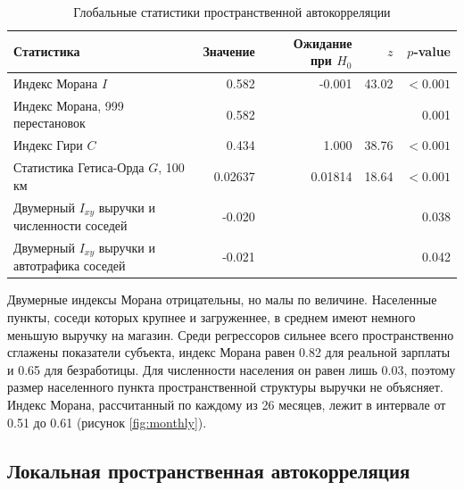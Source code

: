 \documentclass[12pt, a4paper]{article}
\begin{document}
\begin{table}[H]
    \centering
    \footnotesize
    \caption{Глобальные статистики пространственной автокорреляции}
    \label{tab:global}
    \begin{tabular}{lrrrr}
        \toprule
        \textbf{Статистика} & \textbf{Значение} & \textbf{Ожидание при $H_0$} & \textbf{$z$} & \textbf{$p$-value} \\
        \midrule
        Индекс Морана $I$ & 0.582 & -0.001 & 43.02 & $< 0.001$ \\
        Индекс Морана, 999 перестановок & 0.582 &  &  & 0.001 \\
        Индекс Гири $C$ & 0.434 & 1.000 & 38.76 & $< 0.001$ \\
        Статистика Гетиса-Орда $G$, 100 км & 0.02637 & 0.01814 & 18.64 & $< 0.001$ \\
        Двумерный $I_{xy}$ выручки и численности соседей & -0.020 &  &  & 0.038 \\
        Двумерный $I_{xy}$ выручки и автотрафика соседей & -0.021 &  &  & 0.042 \\
        \bottomrule
    \end{tabular}
    \par{}
\end{table}

Двумерные индексы Морана отрицательны, но малы по величине. Населенные пункты, соседи которых крупнее и
загруженнее, в среднем имеют немного меньшую выручку на магазин. Среди регрессоров сильнее всего
пространственно сглажены показатели субъекта, индекс Морана равен 0.82 для реальной зарплаты и
0.65 для безработицы. Для численности населения он равен лишь 0.03, поэтому размер населенного пункта
пространственной структуры выручки не объясняет. Индекс Морана, рассчитанный по каждому из 26
месяцев, лежит в интервале от 0.51 до 0.61 (рисунок \ref{fig:monthly}).

\subsection*{Локальная пространственная автокорреляция}
\end{document}
